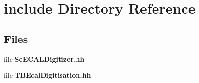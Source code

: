 \section{include Directory Reference}
\label{dir_3566a47ffc53d2f24c0695e84f231538}
\subsection*{Files}
\begin{DoxyCompactItemize}
\item 
file {\bfseries Sc\-E\-C\-A\-L\-Digitizer.\-hh}
\item 
file {\bfseries T\-B\-Ecal\-Digitisation.\-hh}
\end{DoxyCompactItemize}
